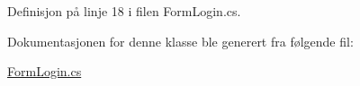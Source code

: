 Definisjon på linje 18 i filen Form\+Login.\+cs.



Dokumentasjonen for denne klasse ble generert fra følgende fil\+:\begin{DoxyCompactItemize}
\item 
\hyperlink{_form_login_8cs}{Form\+Login.\+cs}\end{DoxyCompactItemize}

